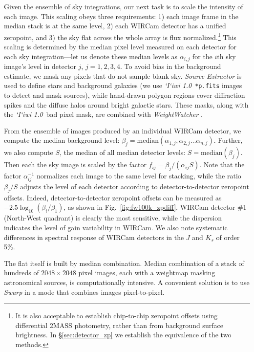 \documentclass[iop]{emulateapj}
\newcommand{\sw}[1]{\textit{#1}} %
\newcommand{\iiwione}{\sw{`I`iwi 1.0}}
\newcommand{\Fig}[1]{Fig.~\ref{fig:#1}}  %
\newcommand{\Sec}[1]{\S\ref{sec:#1}}  %
\begin{document}
Given the ensemble of sky integrations, our next task is to scale the intensity of each image.
This scaling obeys three requirements: 1) each image frame in the median stack is at the same level, 2) each WIRCam detector has a unified zeropoint, and 3) the sky flat across the whole array is flux normalized.\footnote{It is also acceptable to establish chip-to-chip zeropoint offsets using differential 2MASS photometry, rather than from background surface brightness. In \Sec{detector_zp} we establish the equivalence of the two methods.}
This scaling is determined by the median pixel level measured on each detector for each sky integration---let us denote these median levels as $\alpha_{i,j}$ for the $i$th sky image's level in detector $j$, $j=1, 2, 3, 4$.
To avoid bias in the background estimate, we mask any pixels that do not sample blank sky.
\sw{Source Extractor} \citep{Bertin:1996} is used to define stars and background galaxies (we use \iiwione\ \texttt{*p.fits} images to detect and mask sources), while hand-drawn polygon regions cover diffraction spikes and the diffuse halos around bright galactic stars. These masks, along with the \iiwione\ bad pixel mask, are combined with \sw{WeightWatcher} \citep{Marmo:2008}.

From the ensemble of images produced by an individual WIRCam detector, we compute the median background level: $\beta_j = \mathrm{median}(\alpha_{1,j}, \alpha_{2,j}\ldots \alpha_{n,j} )$.
Further, we also compute $S$, the median of all median detector levels: $S=\mathrm{median}(\beta_j)$.
Then each the sky image is scaled by the factor $f_{ij} = \beta_j / (\alpha_{ij} S)$.
Note that the factor $\alpha_{ij}^{-1}$ normalizes each image to the same level for stacking, while the ratio $\beta_j / S$ adjusts the level of each detector according to detector-to-detector zeropoint offsets.
Indeed, detector-to-detector zeropoint offsets can be measured as $-2.5 \log_{10}(\beta_i / \beta_1)$, as shown in \Fig{fw100k_zpdiff}.
WIRCam detector \#1 (North-West quadrant) is clearly the most sensitive, while the dispersion indicates the level of gain variability in WIRCam.
We also note systematic differences in spectral response of WIRCam detectors in the $J$ and $K_s$ of order 5\%.

The flat itself is built by median combination.
Median combination of a stack of hundreds of $2048\times2048$ pixel images, each with a weightmap masking astronomical sources, is computationally intensive.
A convenient solution is to use \sw{Swarp} \citep[an image-mosaicing software package,][]{Bertin:2002} in a mode that combines images pixel-to-pixel.
\end{document}
